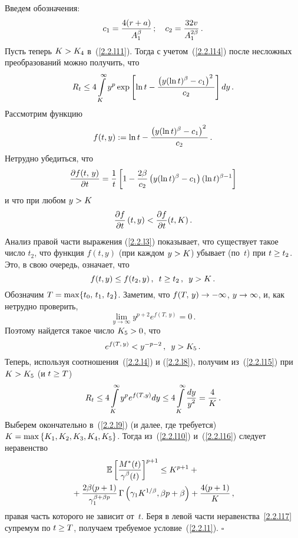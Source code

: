 \begin{multicols}{2}
  Введем обозначения:
$$
c_1=\displaystyle\frac{\displaystyle 4(r+a)\mathstrut}{\displaystyle A_1^\beta\mathstrut}\,;\quad c_2=\displaystyle\frac{\displaystyle 32 v \mathstrut}{\displaystyle A_1^{2\beta}\mathstrut}\,.
$$
Пусть теперь  $K\hm>K_4$ в~(\ref{2.2.l11}).  Тогда с учетом~(\ref{2.2.l14}) 
после несложных преобразований можно получить, что
\begin{equation}
R_t \leq 4 \int\limits_{K}^\infty y^p \exp\left[ \ln t -
\displaystyle\frac{\displaystyle \left( y(\ln t)^\beta-c_1\right)^2\mathstrut}{\displaystyle c_2\mathstrut} \right]dy\,.
\label{2.2.l15}
\end{equation}
Рассмотрим функцию
$$
f(t,y):=\ln t -\displaystyle\frac{\displaystyle \left(y(\ln t)^\beta-c_1\right)^2\mathstrut}{\displaystyle c_2\mathstrut}\,.
$$
 Нетрудно убедиться, что
\begin{equation}
\label{2.2.l3} 
\displaystyle\frac{\displaystyle \partial f(t,\,y)\mathstrut}{\displaystyle \partial t\mathstrut}=\displaystyle\frac{\displaystyle 1\mathstrut}{\displaystyle t\mathstrut}\left[ 1-\displaystyle\frac{\displaystyle 2\beta\mathstrut}{\displaystyle c_2\mathstrut}\left(y(\ln
t)^\beta-c_1\right)(\ln t)^{\beta-1} \right]
\end{equation}
и что при любом $y\hm>K$
$$
\displaystyle\frac{\displaystyle \partial
f\mathstrut}{\displaystyle \partial t\mathstrut}\left(t,y\right)<\displaystyle\frac{\displaystyle \partial f\mathstrut}{\displaystyle \partial t\mathstrut}(t,K)\,.
$$
Анализ правой части выражения (\ref{2.2.l3}) показывает, что
существует такое число $t_2$, что функция $f(t,y)$ (при каждом
$y\hm>K$) убывает (по~$t$) при $t\hm\geq t_2$. Это, в свою очередь, означает, что
\begin{equation}
\label{2.2.l4}
f(t,y) \leq f(t_2,y)\,,\enskip t\geq t_2\,,\enskip y>K\,.
\end{equation}
Обозначим $T\hm=\max\{t_0,\,t_1,\,t_2\}$. Заметим, что
$f(T,\,y) \hm\to -\infty$, $y \hm\to \infty$, и, как нетрудно проверить,
$$
\lim\limits_{y \to \infty} y^{p+2}e^{f(T,\,y)}=0\,.
$$
Поэтому найдется такое число $K_5\hm>0$, что
\begin{equation}
\label{2.2.l8} 
e^{f(T,\,y)}<y^{-p-2}\,,\enskip y>K_5\,.
\end{equation}
Теперь, используя соотношения~(\ref{2.2.l4}) и (\ref{2.2.l8}),
получим из~(\ref{2.2.l15})  при  $K\hm>K_5$ (и $t \hm\geq T$)
\begin{equation}
R_t  \leq 4 \int\limits_{K}^\infty y^p e^{f(T,y)}dy \leq 
4 \int\limits_{K}^\infty \displaystyle\frac{\displaystyle dy\mathstrut}{\displaystyle y^2\mathstrut}=\displaystyle\frac{\displaystyle 4\mathstrut}{\displaystyle K\mathstrut}\,.
\label{2.2.l16}
\end{equation}
Выберем окончательно в~(\ref{2.2.l9}) (и далее, где требуется)
$K\hm=\max \left\{K_1,K_2,K_3,K_4,K_5\right\}$. Тогда из~(\ref{2.2.l10}) и~(\ref{2.2.l16}) 
следует неравенство
\begin{multline}
\mathbb{E} \left[ \displaystyle\frac{\displaystyle M^*(t)\mathstrut}{\displaystyle \gamma^\beta(t)\mathstrut}\right]^{p+1} \leq 
K^{p+1} + {}\\
{}+\displaystyle\frac{\displaystyle 2\beta(p+1)\mathstrut}{\displaystyle \gamma_1^{\beta+\beta p}\mathstrut}\, \Gamma\left(
\gamma_1 K^{1/\beta},\beta p+\beta \right) + \displaystyle\frac{\displaystyle 4(p+1)\mathstrut}{\displaystyle K\mathstrut}\,, 
\label{2.2.l17}
\end{multline}
 правая часть которого не зависит от~$t$. Беря  в левой части
неравенства~\eqref{2.2.l17}  супремум по  $t \hm\geq T$, получаем требуемое 
условие~(\ref{2.2.l1}). \hfill$\square$



\end{multicols}
